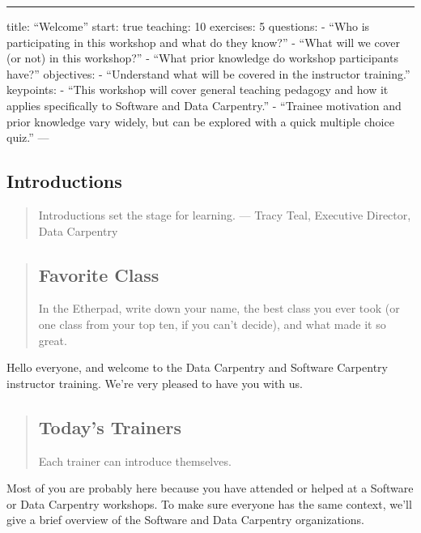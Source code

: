 \begin{center}
\rule{3in}{0.4pt}
\end{center}
title: ``Welcome''
start: true
teaching: 10
exercises: 5
questions:
- ``Who is participating in this workshop and what do they know?''
- ``What will we cover (or not) in this workshop?''
- ``What prior knowledge do workshop participants have?''
objectives:
- ``Understand what will be covered in the instructor training.''
keypoints:
- ``This workshop will cover general teaching pedagogy and how it applies specifically to Software and Data Carpentry.''
- ``Trainee motivation and prior knowledge vary widely, but can be explored with a quick multiple choice quiz.''
---

\subsection*{Introductions}

\begin{quote}   %
Introductions set the stage for learning.\newline
— Tracy Teal, Executive Director, Data Carpentry
\end{quote}   %

\begin{quotation}   %
\subsection*{Favorite Class}

In the Etherpad, write down your name, the best class you ever
took (or one class from your top ten, if you can't decide), and
what made it so great.
\end{quotation}   %

Hello everyone, and welcome to the Data Carpentry and Software Carpentry
instructor training.  We're very pleased to have you with us.

\begin{quotation}   %
\subsection*{Today's Trainers}

Each trainer can introduce themselves.
\end{quotation}   %

Most of you are probably here because you have attended or helped at
a Software or Data Carpentry workshops.  To make sure everyone has the
same context, we'll give a brief overview of the Software and Data
Carpentry organizations.

